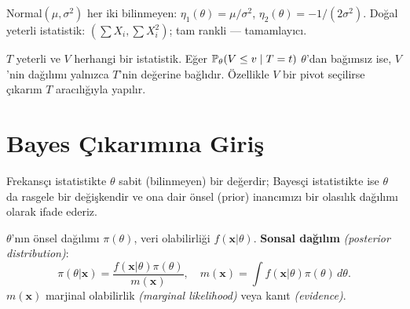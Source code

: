 \begin{ornek}\label{ex:cift_param_ustel}
Normal$(\mu,\sigma^2)$ her iki bilinmeyen: $\eta_1(\theta)=\mu/\sigma^2$, $\eta_2(\theta)=-1/(2\sigma^2)$. Doğal yeterli istatistik: $(\sum X_i, \sum X_i^2)$; tam rankli --- tamamlayıcı.
\end{ornek}

\begin{teorem}\label{thm:yeterli_bagimsizlik}
$T$ yeterli ve $V$ herhangi bir istatistik. Eğer $\mathbb{P}_\theta(V\leq v\mid T=t)$ $\theta$'dan bağımsız ise, $V$'nin dağılımı yalnızca $T$'nin değerine bağlıdır. Özellikle $V$ bir pivot seçilirse çıkarım $T$ aracılığıyla yapılır.
\end{teorem}

\section{Bayes Çıkarımına Giriş}
\label{sec:bayes_giris}

\begin{kesif}
Frekansçı istatistikte $\theta$ sabit (bilinmeyen) bir değerdir; Bayesçi istatistikte ise $\theta$ da rasgele bir değişkendir ve ona dair önsel (prior) inancımızı bir olasılık dağılımı olarak ifade ederiz.
\end{kesif}

\begin{tanim}\label{def:bayes_istatistik}
$\theta$'nın önsel dağılımı $\pi(\theta)$, veri olabilirliği $f(\mathbf{x}|\theta)$. \textbf{Sonsal dağılım} \emph{(posterior distribution)}:
\[
  \pi(\theta|\mathbf{x}) = \frac{f(\mathbf{x}|\theta)\pi(\theta)}{m(\mathbf{x})}, \quad m(\mathbf{x}) = \int f(\mathbf{x}|\theta)\pi(\theta)\,d\theta.
\]
$m(\mathbf{x})$ marjinal olabilirlik \emph{(marginal likelihood)} veya kanıt \emph{(evidence)}.
\end{tanim}


